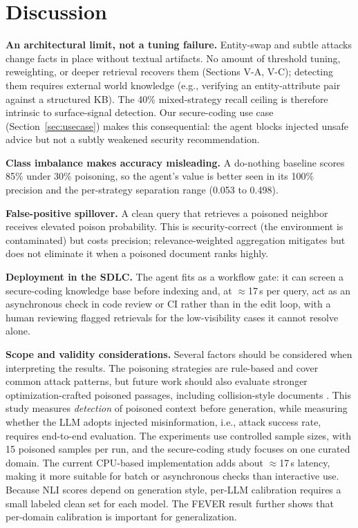 \section{Discussion}
\label{sec:discussion}

\textbf{An architectural limit, not a tuning failure.} Entity-swap and subtle attacks change facts in place without textual artifacts. No amount of threshold tuning, reweighting, or deeper retrieval recovers them (Sections V-A, V-C); detecting them requires external world knowledge (e.g., verifying an entity-attribute pair against a structured KB). The 40\% mixed-strategy recall ceiling is therefore intrinsic to surface-signal detection. Our secure-coding use case (Section~\ref{sec:usecase}) makes this consequential: the agent blocks injected unsafe advice but not a subtly weakened security recommendation.

\textbf{Class imbalance makes accuracy misleading.} A do-nothing baseline scores 85\% under 30\% poisoning, so the agent's value is better seen in its 100\% precision and the per-strategy separation range (0.053 to 0.498).

\textbf{False-positive spillover.} A clean query that retrieves a poisoned neighbor receives elevated poison probability. This is security-correct (the environment is contaminated) but costs precision; relevance-weighted aggregation mitigates but does not eliminate it when a poisoned document ranks highly.

\textbf{Deployment in the SDLC.} The agent fits as a workflow gate: it can screen a secure-coding knowledge base before indexing and, at $\approx$17\,s per query, act as an asynchronous check in code review or CI rather than in the edit loop, with a human reviewing flagged retrievals for the low-visibility cases it cannot resolve alone.

\textbf{Scope and validity considerations.} Several factors should be considered when interpreting the results. The poisoning strategies are rule-based and cover common attack patterns, but future work should also evaluate stronger optimization-crafted poisoned passages, including collision-style documents \cite{zou2024poisoned,zhong2023poisoning}. This study measures \emph{detection} of poisoned context before generation, while measuring whether the LLM adopts injected misinformation, i.e., attack success rate, requires end-to-end evaluation. The experiments use controlled sample sizes, with 15 poisoned samples per run, and the secure-coding study focuses on one curated domain. The current CPU-based implementation adds about $\approx$17\,s latency, making it more suitable for batch or asynchronous checks than interactive use. Because NLI scores depend on generation style, per-LLM calibration requires a small labeled clean set for each model. The FEVER result further shows that per-domain calibration is important for generalization.


